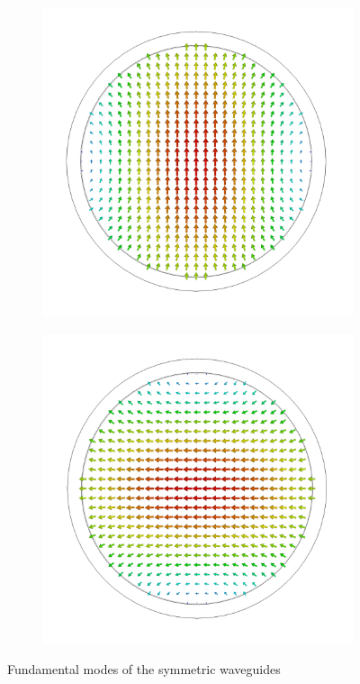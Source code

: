 \documentclass[11pt,a4paper,twoside,openany]{report}
\begin{document}
\begin{figure}[!ht]
    \begin{subfigure}{.45\textwidth}
        \centering
        \includegraphics[width=.75\textwidth]{src/waveguide_circular_mode1.png}
        \caption{\label{fig:circular-waveguide-mode1}}
    \end{subfigure}
    \hspace{0.5cm}
    \begin{subfigure}{.45\textwidth}
        \centering
        \includegraphics[width=.75\textwidth]{src/waveguide_circular_mode2.png}
        \caption{\label{fig:circular-waveguide-mode2}}
    \end{subfigure}
    \caption{\label{fig:symmetric-waveguide-modes}Fundamental modes of the symmetric waveguides}
\end{figure}
\end{document}
